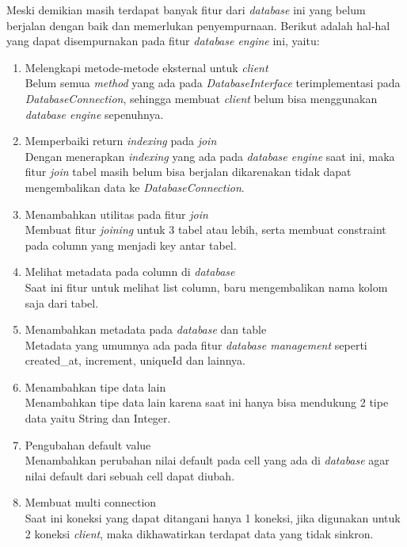 Meski demikian masih terdapat banyak fitur dari \emph{database} ini yang belum berjalan dengan baik dan memerlukan penyempurnaan. Berikut adalah hal-hal yang dapat disempurnakan pada fitur \emph{database
engine} ini, yaitu:
\begin{enumerate}
	\item Melengkapi metode-metode eksternal untuk \emph{client} \\
  	Belum semua \emph{method} yang ada pada \emph{DatabaseInterface} terimplementasi pada \emph{DatabaseConnection}, sehingga membuat \emph{client} belum bisa menggunakan \emph{database engine} sepenuhnya.
	
	\item Memperbaiki return \emph{indexing} pada \emph{join} \\
	Dengan menerapkan \emph{indexing} yang ada pada \emph{database engine} saat ini, maka fitur \emph{join} tabel masih belum bisa berjalan dikarenakan tidak dapat mengembalikan data ke \emph{DatabaseConnection}.

	\item Menambahkan utilitas pada fitur \emph{join} \\
	Membuat fitur \emph{joining} untuk 3 tabel atau lebih, serta membuat constraint pada column yang menjadi key antar tabel.
	
	\item Melihat metadata pada column di \emph{database} \\
	Saat ini fitur untuk melihat list column, baru mengembalikan nama kolom saja dari tabel.

	\item Menambahkan metadata pada \emph{database} dan table \\
	Metadata yang umumnya ada pada fitur \emph{database management} seperti created\_at, increment, uniqueId dan lainnya.

	\item Menambahkan tipe data lain \\
	Menambahkan tipe data lain karena saat ini hanya bisa mendukung 2 tipe data yaitu String dan Integer.

	\item Pengubahan default value \\
	Menambahkan perubahan nilai default pada cell yang ada di \emph{database} agar nilai default dari sebuah cell dapat diubah.

	\item Membuat multi connection \\
	Saat ini koneksi yang dapat ditangani hanya 1 koneksi, jika digunakan untuk 2 koneksi \emph{client}, maka dikhawatirkan terdapat data yang tidak sinkron.


\end{enumerate}
